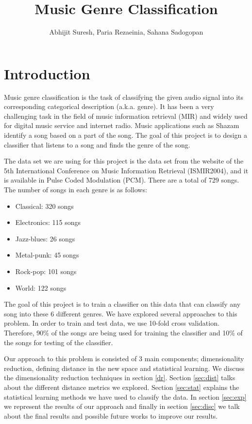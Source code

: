 \documentclass[12pt]{article}
\title{Music Genre Classification}
\author{Abhijit Suresh, Paria Rezaeinia, Sahana Sadogopan}
\begin{document}
	\maketitle

\section{Introduction}
Music genre classification is the task of classifying the given audio signal into its corresponding categorical description (a.k.a. genre). It has been a very challenging task in the field of music information retrieval (MIR) and widely used for digital music service and internet radio. Music applications such as Shazam identify a song based on a part of the song. The goal of this project is to design a classifier that listens to a song and finds the genre of the song.

The data set we are using for this project is the data set from the website of the 5th International Conference on Music Information Retrieval (ISMIR2004), and it is available in Pulse Coded Modulation (PCM). There are a total of 729 songs. The number of songs in each genre is as follows:
\begin{itemize}
	\item Classical: 320 songs
	\item Electronics: 115 songs
	\item Jazz-blues: 26 songs
	\item Metal-punk: 45 songs
	\item Rock-pop: 101 songs
	\item World: 122 songs
\end{itemize}
The goal of this project is to train a classifier on this data that can classify any song into these 6 different genres. We have explored several approaches to this problem. In order to train and test data, we use 10-fold cross validation. Therefore, 90\% of the songs are being used for training the classifier and 10\% of the songs for testing of the classifier.

Our approach to this problem is consisted of 3 main components; dimensionality reduction, defining distance in the new space and statistical learning. We discuss the dimensionality reduction techniques in section \ref{dr}. Section \ref{sec:dist} talks about the different distance metrics we explored. Section \ref{sec:stat} explains the statistical learning methods we have used to classify the data. In section \ref{sec:exp} we represent the results of our approach and finally in section \ref{sec:disc} we talk about the final results and possible future works to improve our results.
\end{document}
